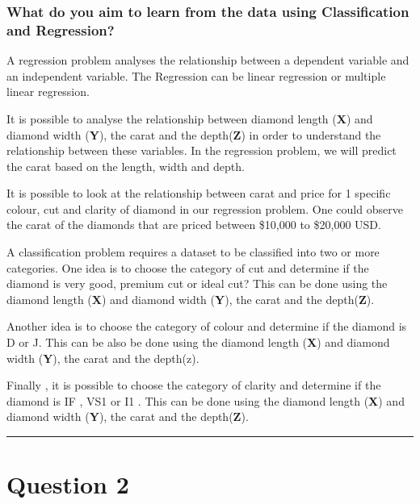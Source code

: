 \documentclass[
]{article}
\begin{document}
\hypertarget{what-do-you-aim-to-learn-from-the-data-using-classification-and-regression}{%
\subsubsection{What do you aim to learn from the data using
Classification and
Regression?}\label{what-do-you-aim-to-learn-from-the-data-using-classification-and-regression}}

A regression problem analyses the relationship between a dependent
variable and an independent variable. The Regression can be linear
regression or multiple linear regression.

It is possible to analyse the relationship between diamond length
(\textbf{X}) and diamond width (\textbf{Y}), the carat and the
depth(\textbf{Z}) in order to understand the relationship between these
variables. In the regression problem, we will predict the carat based on
the length, width and depth.

It is possible to look at the relationship between carat and price for 1
specific colour, cut and clarity of diamond in our regression problem.
One could observe the carat of the diamonds that are priced between
\$10,000 to \$20,000 USD.

A classification problem requires a dataset to be classified into two or
more categories. One idea is to choose the category of cut and determine
if the diamond is very good, premium cut or ideal cut? This can be done
using the diamond length (\textbf{X}) and diamond width (\textbf{Y}),
the carat and the depth(\textbf{Z}).

Another idea is to choose the category of colour and determine if the
diamond is D or J. This can be also be done using the diamond length
(\textbf{X}) and diamond width (\textbf{Y}), the carat and the depth(z).

Finally , it is possible to choose the category of clarity and determine
if the diamond is IF , VS1 or I1 . This can be done using the diamond
length (\textbf{X}) and diamond width (\textbf{Y}), the carat and the
depth(\textbf{Z}).

\begin{center}\rule{0.5\linewidth}{0.5pt}\end{center}

\hypertarget{question-2}{%
\section{Question 2}\label{question-2}}
\end{document}
